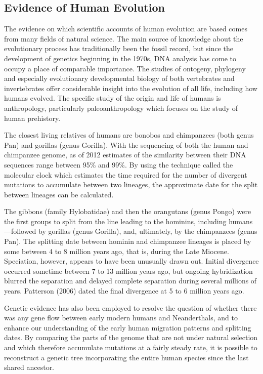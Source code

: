 \hypertarget{evidence-of-human-evolution}{%
\subsection{Evidence of Human Evolution}\label{evidence-of-human-evolution}}

The evidence on which scientific accounts of human evolution are based comes from many fields of natural science. The main source of knowledge about the evolutionary process has traditionally been the fossil record, but since the development of genetics beginning in the 1970s, DNA analysis has come to occupy a place of comparable importance. The studies of ontogeny, phylogeny and especially evolutionary developmental biology of both vertebrates and invertebrates offer considerable insight into the evolution of all life, including how humans evolved. The specific study of the origin and life of humans is anthropology, particularly paleoanthropology which focuses on the study of human prehistory.

The closest living relatives of humans are bonobos and chimpanzees (both genus Pan) and gorillas (genus Gorilla). With the sequencing of both the human and chimpanzee genome, as of 2012 estimates of the similarity between their DNA sequences range between 95\% and 99\%. By using the technique called the molecular clock which estimates the time required for the number of divergent mutations to accumulate between two lineages, the approximate date for the split between lineages can be calculated.

The gibbons (family Hylobatidae) and then the orangutans (genus Pongo) were the first groups to split from the line leading to the hominins, including humans---followed by gorillas (genus Gorilla), and, ultimately, by the chimpanzees (genus Pan). The splitting date between hominin and chimpanzee lineages is placed by some between 4 to 8 million years ago, that is, during the Late Miocene. Speciation, however, appears to have been unusually drawn out. Initial divergence occurred sometime between 7 to 13 million years ago, but ongoing hybridization blurred the separation and delayed complete separation during several millions of years. Patterson (2006) dated the final divergence at 5 to 6 million years ago.

Genetic evidence has also been employed to resolve the question of whether there was any gene flow between early modern humans and Neanderthals, and to enhance our understanding of the early human migration patterns and splitting dates. By comparing the parts of the genome that are not under natural selection and which therefore accumulate mutations at a fairly steady rate, it is possible to reconstruct a genetic tree incorporating the entire human species since the last shared ancestor.


